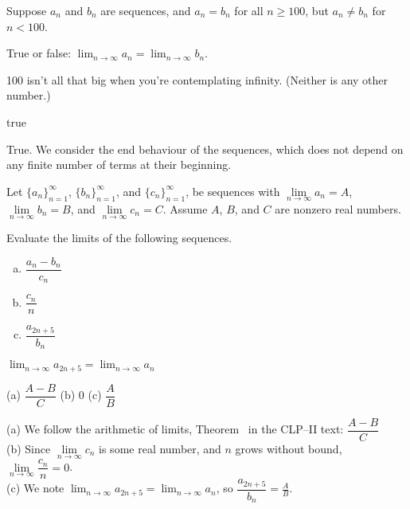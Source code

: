\begin{Mquestion}
Suppose $a_n$ and $b_n$ are sequences, and $a_n=b_n$ for all $n \geq 100$, but $a_n \neq b_n$ for $n < 100$.

True or false: $\displaystyle\lim_{n \to \infty} a_n = \lim_{n \to \infty} b_n$.
\end{Mquestion}
\begin{hint}
100 isn't all that big when you're contemplating infinity. (Neither is any other number.)
\end{hint}
\begin{answer}
true
\end{answer}
\begin{solution}
True. We consider the end behaviour of the sequences, which does not depend on any finite number of terms at their beginning.
\end{solution}
\begin{question}
Let $\{a_n\}_{n=1}^{\infty}$, $\{b_n\}_{n=1}^{\infty}$,  and $\{c_n\}_{n=1}^{\infty}$,  be sequences with
$\lim\limits_{n \to \infty}a_n=A$, $\lim\limits_{n \to \infty}b_n=B$, and $\lim\limits_{n \to \infty}c_n=C$. Assume $A$, $B$, and $C$ are nonzero real numbers.

Evaluate the limits of the following sequences.
\begin{enumerate}[(a)]
\item $\dfrac{a_n-b_n}{c_n}$
\item $\dfrac{c_n}{n}$
\item $\dfrac{a_{2n+5}}{b_n}$
\end{enumerate}
\end{question}
\begin{hint}
$\displaystyle\lim_{n \to \infty}a_{2n+5}=\lim_{n \to \infty}a_{n}$
\end{hint}
\begin{answer}
(a) $\dfrac{A-B}{C}$ \qquad (b) 0 \qquad (c) $\dfrac{A}{B}$
\end{answer}
\begin{solution}
(a) We follow the arithmetic of limits, Theorem~ in the CLP--II text:
$\dfrac{A-B}{C}$\\
(b) Since $\lim\limits_{n \to \infty}{c_n}$ is some real number, and $n$ grows without bound, $\lim\limits_{n \to \infty}\dfrac{c_n}{n}=0$.\\
(c) We note $\displaystyle\lim_{n \to \infty}a_{2n+5}=\lim_{n \to \infty}a_{n}$, so
$\displaystyle\dfrac{a_{2n+5}}{b_n} = \frac{A}{B}$.
\end{solution}
